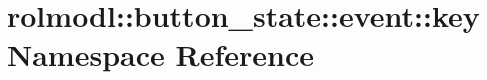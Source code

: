 \hypertarget{namespacerolmodl_1_1button__state_1_1event_1_1key}{}\section{rolmodl\+::button\+\_\+state\+::event\+::key Namespace Reference}
\label{namespacerolmodl_1_1button__state_1_1event_1_1key}
